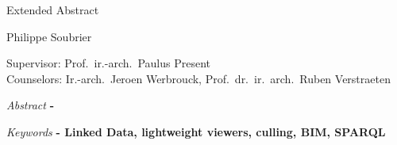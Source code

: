 \begin{center}
    \sffamily
    \huge Extended Abstract

    \Large Philippe Soubrier

    \normalsize
    Supervisor: Prof.\ ir.-arch.\ Paulus Present\\
    Counselors: Ir.-arch.\ Jeroen Werbrouck, Prof.\ dr.\ ir.\ arch.\ Ruben Verstraeten
\end{center}
\begin{multicols}{2}
    \small
    \emph{Abstract} \textbf{
        - \lipsum[1]
    }

    \emph{Keywords} \textbf{
        - Linked Data, lightweight viewers, culling, BIM, SPARQL
    }
    
    \lipsum[1-9]

\end{multicols}
\restoregeometry